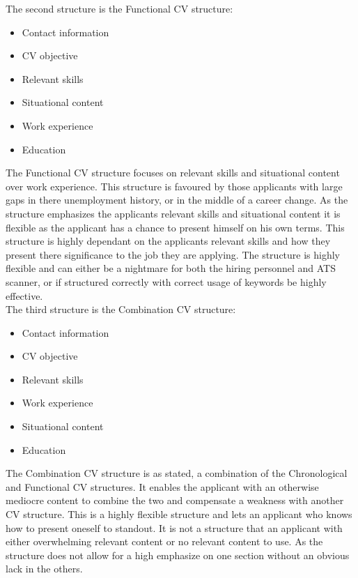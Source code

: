 The second structure is the Functional CV structure:
\begin{itemize}
   \item  Contact information
   \item  CV objective
   \item  Relevant skills
   \item  Situational content
   \item  Work experience
   \item  Education\\ 
   \end{itemize}
The Functional CV structure focuses on relevant skills and situational content over work experience.
This structure is favoured by those applicants with large gaps in there unemployment history, or in the middle of a career change.
As the structure emphasizes the applicants relevant skills and situational content it is flexible as the applicant has a chance to present himself on his own terms.
This structure is highly dependant on the applicants relevant skills and how they present there significance to the job they are applying.
The structure is highly flexible and can either be a nightmare for both the hiring personnel and ATS scanner, or if structured correctly with correct usage of keywords be highly effective.\\
 
The third structure is the Combination CV structure:
\begin{itemize}
   \item  Contact information
   \item  CV objective
   \item  Relevant skills
   \item  Work experience
   \item  Situational content
   \item  Education \\
   \end{itemize}
The Combination CV structure is as stated, a combination of the Chronological and Functional CV structures. 
It enables the applicant with an otherwise mediocre content to combine the two and compensate a weakness with another CV structure.
This is a highly flexible structure and lets an applicant who knows how to present oneself to standout.
It is not a structure that an applicant with either overwhelming relevant content or no relevant content to use.
As the structure does not allow for a high emphasize on one section without an obvious lack in the others.
   \cite{Resume_structure}
   \cite{Tips_for_best_format}
   \cite{8_Best_cv_format}
\clearpage

